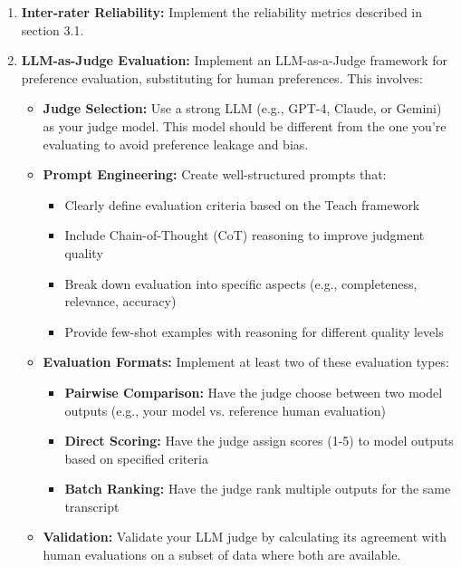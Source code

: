 \documentclass[11pt]{article}
\begin{document}
\begin{enumerate}
    \item \textbf{Inter-rater Reliability:} Implement the reliability metrics described in section 3.1.
    
    \item \textbf{LLM-as-Judge Evaluation:} Implement an LLM-as-a-Judge framework for preference evaluation, substituting for human preferences. This involves:
    
    \begin{itemize}
        \item \textbf{Judge Selection:} Use a strong LLM (e.g., GPT-4, Claude, or Gemini) as your judge model. This model should be different from the one you're evaluating to avoid preference leakage and bias.
        
        \item \textbf{Prompt Engineering:} Create well-structured prompts that:
        \begin{itemize}
            \item Clearly define evaluation criteria based on the Teach framework
            \item Include Chain-of-Thought (CoT) reasoning to improve judgment quality
            \item Break down evaluation into specific aspects (e.g., completeness, relevance, accuracy)
            \item Provide few-shot examples with reasoning for different quality levels
        \end{itemize}
        
        \item \textbf{Evaluation Formats:} Implement at least two of these evaluation types:
        \begin{itemize}
            \item \textbf{Pairwise Comparison:} Have the judge choose between two model outputs (e.g., your model vs. reference human evaluation)
            \item \textbf{Direct Scoring:} Have the judge assign scores (1-5) to model outputs based on specified criteria
            \item \textbf{Batch Ranking:} Have the judge rank multiple outputs for the same transcript
        \end{itemize}
        
        \item \textbf{Validation:} Validate your LLM judge by calculating its agreement with human evaluations on a subset of data where both are available.
    \end{itemize}
    

\end{enumerate}
\end{document}
